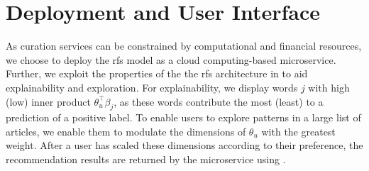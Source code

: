 \section{Deployment and User Interface}

As curation services can be constrained by computational and financial resources, we choose to deploy the \gls{rfs} model as a cloud computing-based microservice. Further, we exploit the properties of the the \gls{rfs} architecture in  to aid explainability and exploration. For explainability, we display words $j$ with high (low) inner product $\theta_u^\top\beta_j$, as these words contribute the most (least) to a prediction of a positive label. To enable users to explore patterns in a large list of articles, we enable them to modulate the dimensions of $\theta_u$ with the greatest weight. After a user has scaled these dimensions according to their preference, the recommendation results are returned by the microservice using .